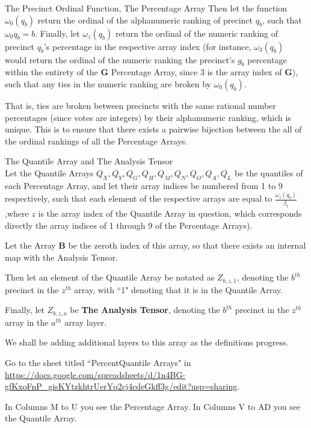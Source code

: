 \begin{definition}{The Precinct Ordinal Function, The Percentage Array}
Then let the function $\omega_{0}(q_{b})$ return the ordinal of the alphanumeric ranking of precinct $q_{b}$, such that $\omega_0{q_{b}}=b$.
\newpage
Finally, let $\omega_{z}(q_{b})$ return the ordinal of the numeric ranking of precinct $q_{b}$'s percentage in the respective array index (for instance, $\omega_{3}(q_{b})$ would return the ordinal of the numeric ranking the precinct's $g_{b}$ percentage within the entirety of the \textbf{G} Percentage Array, since 3 is the array index of \textbf{G}), such that any ties in the numeric ranking are broken by $\omega_{0}(q_{b})$. 

That is, ties are broken between precincts with the same rational number percentages (since votes are integers) by their alphanumeric ranking, which is unique. This is to ensure that there exists a pairwise bijection between the all of the ordinal rankings of all the Percentage Arrays.
\end{definition}

\begin{definition}{The Quantile Array and The Analysis Tensor}\\
Let the Quantile Arrays $Q_{X},Q_{Y},Q_{G},Q_{H},Q_{M},Q_{N},Q_{O},Q_{A},Q_{L}$ be the quantiles of each Percentage Array, and let their array indices be numbered from 1 to 9 respectively, such that each element of the respective arrays are equal to $\frac{\omega_{z}(q_{b})}{\beta_{7}}$ ,where $z$ is the array index of the Quantile Array in question, which corresponds directly the array indices of 1 through 9 of the Percentage Arrays).

Let the Array \textbf{B} be the zeroth index of this array, so that there exists an internal map with the Analysis Tensor.

Then let an element of the Quantile Array be notated as $Z_{b,z,1}$, denoting the $b^{th}$ precinct in the $z^{th}$ array, with ``1" denoting that it is in the Quantile Array.

Finally, let $Z_{b,z,a}$ be \textbf{The Analysis Tensor}, denoting the  $b^{th}$ precinct in the $z^{th}$ array in the $a^{th}$ array layer. 
\end{definition}

We shall be adding additional layers to this array as the definitions progress.

Go to the sheet titled ``PercentQuantile Arrays" in \url{https://docs.google.com/spreadsheets/d/1n4BG-gfKxoFnP_gisKYtzkhtrUerYq2cj4cdeGkff3g/edit?usp=sharing}.

In Columns M to U you see the Percentage Array. In Columns V to AD you see the Quantile Array.

